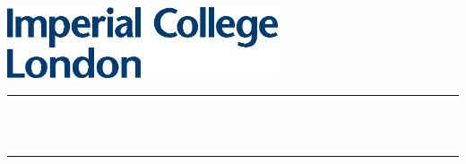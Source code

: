 \begin{titlepage}

\newcommand{\HRule}{\rule{\linewidth}{0.5mm}} %


\includegraphics[width=8cm]{title/logo.eps}\\[1cm] %
 

\begin{center}



\makeatletter
\HRule \\[0.4cm]
{ \huge \bfseries \@title}\\[0.4cm] %
\HRule \\[1.5cm]
 


\end{center}
\end{titlepage}
